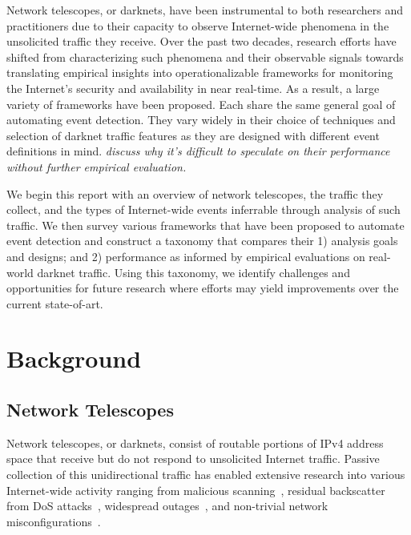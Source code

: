 \documentclass[manuscript,nonacm]{acmart}
\begin{document}
Network telescopes, or darknets, have been instrumental to both researchers and practitioners due to their capacity to observe Internet-wide phenomena in the unsolicited traffic they receive.
Over the past two decades, research efforts have shifted from characterizing such phenomena and their observable signals towards translating empirical insights into operationalizable frameworks for monitoring the Internet's security and availability in near real-time.
As a result, a large variety of frameworks have been proposed. 
Each share the same general goal of automating event detection.
They vary widely in their choice of techniques and selection of darknet traffic features as they are designed with different event definitions in mind.
\textit{discuss why it's difficult to speculate on their performance without further empirical evaluation.}



% 

We begin this report with an overview of network telescopes, the traffic they collect, and the types of Internet-wide events inferrable through analysis of such traffic.
We then survey various frameworks that have been proposed to automate event detection and construct a taxonomy that compares their 1) analysis goals and designs; and 2) performance as informed by empirical evaluations on real-world darknet traffic.
Using this taxonomy, we identify challenges and opportunities for future research where efforts may yield improvements over the current state-of-art.

\section{Background}

\subsection{Network Telescopes}

Network telescopes, or darknets, consist of routable portions of IPv4 address space that receive but do not respond to unsolicited Internet traffic. 
Passive collection of this unidirectional traffic has enabled extensive research into various Internet-wide activity ranging from 
malicious scanning~\cite{@@}, residual backscatter from DoS attacks~\cite{@@}, widespread outages~\cite{@@}, and non-trivial network misconfigurations~\cite{@@}.
\end{document}
